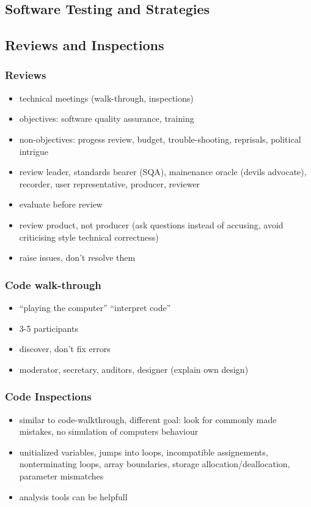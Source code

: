 \documentclass[a4paper, 10pt]{article}
\begin{document}
\subsection*{Software Testing and Strategies}
\subsection*{Reviews and Inspections}
\subsubsection*{Reviews}
\begin{itemize}
	\item technical meetings (walk-through, inspections)
	\item objectives: software quality assurance, training
	\item non-objectives: progess review, budget, trouble-shooting, reprisals, political intrigue
	\item review leader, standards bearer (SQA), mainenance oracle (devils advocate), recorder, user representative, producer, reviewer
	\item evaluate before review
	\item review product, not producer (ask questions instead of accusing, avoid criticising style \follows technical correctness)
	\item raise issues, don't resolve them
\end{itemize}

\subsubsection*{Code walk-through}
\begin{itemize}
	\item ``playing the computer'' \follows ``interpret code''
	\item 3-5 participants
	\item discover, don't fix errors
	\item moderator, secretary, auditors, designer (explain own design)
\end{itemize}

\subsubsection*{Code Inspections}
\begin{itemize}
	\item similar to code-walkthrough, different goal: look for commonly made mistakes, no simulation of computers behaviour
	\item unitialized variables, jumps into loops, incompatible assignements, nonterminating loops, array boundaries, storage allocation/deallocation, parameter mismatches
	\item analysis tools can be helpfull
\end{itemize}
\end{document}
